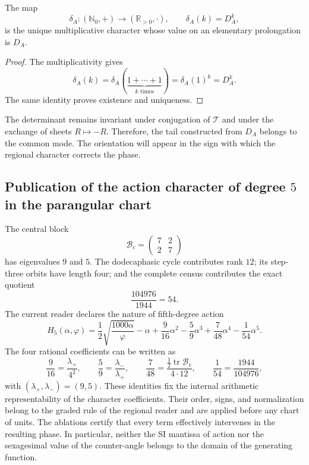 \begin{proposition}
\label{p3-20260826:prop:caracter-determinante}
The map
\[
\delta_A:(\mathbb N_0,+)\longrightarrow(\mathbb R_{>0},\cdot),
\qquad
\delta_A(k)=D_A^k,
\]
is the unique multiplicative character whose value on an elementary
prolongation is \(D_A\).
\end{proposition}

\begin{proof}
The multiplicativity gives
\[
\delta_A(k)
=\delta_A(\underbrace{1+\cdots+1}_{k\text{ times}})
=\delta_A(1)^k=D_A^k.
\]
The same identity proves existence and uniqueness.
\end{proof}

The determinant remains invariant under conjugation of
\(\mathcal T\) and under the exchange of sheets \(R\mapsto-R\). Therefore, the
tail constructed from \(D_A\) belongs to the common mode. The orientation
will appear in the sign with which the regional character corrects the phase.

\subsection{Publication of the action character of degree \texorpdfstring{\(5\)}{5} in the parangular chart}
\label{sec:s102:c38:3:5}


The central block
\[
\mathcal B_c=\begin{pmatrix}7&2\\2&7\end{pmatrix}
\]
has eigenvalues \(9\) and \(5\). The dodecaphasic cycle contributes rank
\(12\); its step-three orbits have length four; and the complete census
contributes the exact quotient
\[
\frac{104976}{1944}=54.
\]
The current reader declares the nature of fifth-degree action
\[
\boxed{
H_5(\alpha,\varphi)
=\frac12\sqrt{\frac{1000\alpha}{\varphi}}-\alpha
+\frac9{16}\alpha^2-\frac59\alpha^3
+\frac7{48}\alpha^4-\frac1{54}\alpha^5.}
\]
The four rational coefficients can be written as
\[
\frac9{16}=\frac{\lambda_+}{4^2},
\qquad
\frac59=\frac{\lambda_-}{\lambda_+},
\qquad
\frac7{48}=\frac{\tfrac12\operatorname{tr}\mathcal B_c}{4\cdot12},
\qquad
\frac1{54}=\frac{1944}{104976},
\]
with \((\lambda_+,\lambda_-)=(9,5)\). These identities fix the
internal arithmetic representability of the character coefficients. Their
order, signs, and normalization belong to the graded rule of the regional
reader and are applied before any chart of units. The ablations
certify that every term effectively intervenes in the resulting phase.
In particular, neither the SI mantissa of action nor the sexagesimal value of the
counter-angle belongs to the domain of the generating function.

